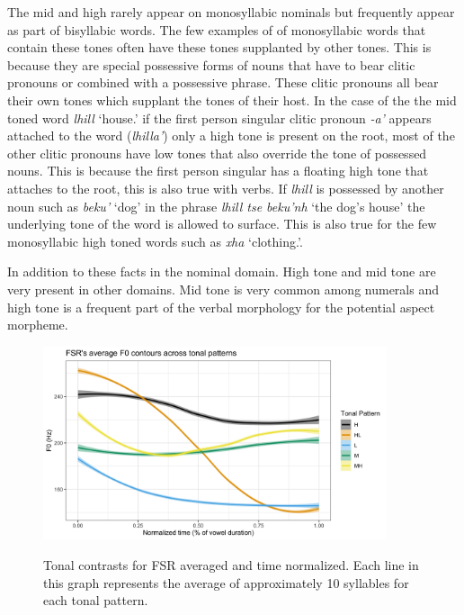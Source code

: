 \documentclass[12pt, letterpaper]{article}
\begin{document}
The mid and high rarely appear on monosyllabic nominals but frequently appear as part of bisyllabic words. The few examples of of monosyllabic words that contain these tones often have these tones supplanted by other tones. This is because they are special possessive forms of nouns that have to bear clitic pronouns or combined with a possessive phrase. These clitic pronouns all bear their own tones which supplant the tones of their host. In the case of the the mid toned word \textit{lhill} `house.\Poss{}{}' if the first person singular clitic pronoun \textit{-a'} appears attached to the word (\textit{lhilla'}) only a high tone is present on the root, most of the other clitic pronouns have low tones that also override the tone of possessed nouns. This is because the first person singular has a floating high tone that attaches to the root, this is also true with verbs. If \textit{lhill} is possessed by another noun such as \textit{beku'} `dog' in the phrase \textit{lhill tse beku'nh} `the dog's house' the underlying tone of the word is allowed to surface. This is also true for the few monosyllabic high toned words such as \textit{xha} `clothing.\Poss{}{}'.

In addition to these facts in the nominal domain. High tone and mid tone are very present in other domains. Mid tone is very common among numerals and high tone is a frequent part of the verbal morphology for the potential aspect morpheme.


\begin{figure}[!ht]
	\centering
	\includegraphics[width=0.9\textwidth]{../FSRTonePlot.png}
	\label{fig:FSRTonePlot}
	\caption{Tonal contrasts for FSR averaged and time normalized. Each line in this graph represents the average of approximately 10 syllables for each tonal pattern. }
\end{figure}
\end{document}
